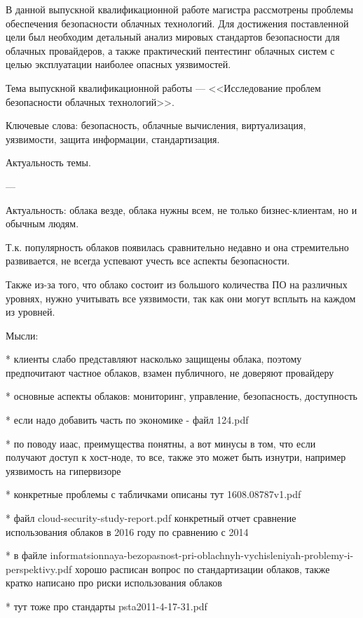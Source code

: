 
В данной выпускной квалификационной работе магистра рассмотрены проблемы обеспечения безопасности облачных технологий.
Для достижения поставленной цели был необходим детальный анализ мировых стандартов безопасности для облачных провайдеров, а также практический пентестинг облачных систем с целью эксплуатации наиболее опасных уязвимостей.

Тема выпускной квалификационной работы --- <<Исследование проблем безопасности облачных технологий>>.

Ключевые слова: безопасность, облачные вычисления, виртуализация, уязвимости, защита информации, стандартизация.

Актуальность темы. 

---

Актуальность: облака везде, облака нужны всем, не только бизнес-клиентам, но и обычным людям.

Т.к. популярность облаков появилась сравнительно недавно и она стремительно развивается, не всегда успевают учесть все аспекты безопасности.

Также из-за того, что облако состоит из большого количества ПО на различных уровнях, нужно учитывать все уязвимости, так как они могут всплыть на каждом из уровней.

Мысли:

* клиенты слабо представляют насколько защищены облака, поэтому предпочитают частное облаков, взамен публичного, не доверяют провайдеру

* основные аспекты облаков: мониторинг, управление, безопасность, доступность

* если надо добавить часть по экономике - файл 124.pdf

* по поводу иаас, преимущества понятны, а вот минусы в том, что если получают доступ к хост-ноде, то все, также это может быть изнутри, например уязвимость на гипервизоре

* конкретные проблемы с табличками описаны тут 1608.08787v1.pdf

* файл cloud-security-study-report.pdf конкретный отчет сравнение использования облаков в 2016 году по сравнению с 2014

* в файле informatsionnaya-bezopasnost-pri-oblachnyh-vychisleniyah-problemy-i-perspektivy.pdf хорошо расписан вопрос по стандартизации облаков, также кратко написано про риски использования облаков

* тут тоже про стандарты psta2011-4-17-31.pdf

